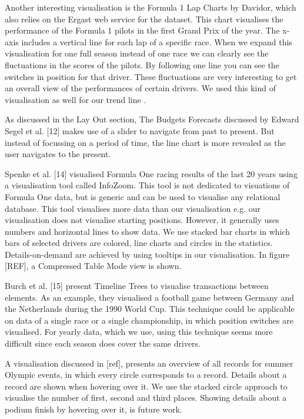 \documentclass{sigchi}
\begin{document}
Another interesting visualisation is the Formula 1 Lap Charts by Davidor, which also relies on the Ergast web service for the dataset. This chart visualises the performance of the Formula 1 pilots in the first Grand Prix of the year. The x-axis includes a vertical line for each lap of a specific race. When we expand this visualisation for one full season instead of one race we can clearly see the fluctuations in the scores of the pilots. By following one line you can see the switches in position for that driver. These fluctuations are very interesting to get an overall view of the performances of certain drivers. We used this kind of visualisation as well for our trend line .

As discussed in the Lay Out section, The Budgets Forecasts discussed by Edward Segel et al. [12] makes use of a slider to navigate from past to present. But instead of focussing on a period of time, the line chart is more revealed as the user navigates to the present.



Spenke et al. [14] visualised Formula One racing results of the last 20 years using a visualisation tool called InfoZoom. This tool is not dedicated to visuations of Formula One data, but is generic and can be used to visualise any relational database. This tool visualises more data than our visualisation e.g. our visualisation does not visualise starting positions. However, it generally uses numbers and horizontal lines to show data. We use stacked bar charts in which bars of selected drivers are colored, line charts and circles in the statistics. Details-on-demand are achieved by using tooltips in our visualisation. In figure [REF], a Compressed Table Mode view is shown.


Burch et al. [15] present Timeline Trees to visualise transactions between elements. As an example, they visualised a football game between Germany and the Netherlands during the 1990 World Cup. This technique could be applicable on data of a single race or a single championship, in which position switches are visualised. For yearly data, which we use, using this technique seems more difficult since each season does cover the same drivers. 

A visualisation discussed in [ref], presents an overview of all records for summer Olympic events, in which every circle corresponds to a record. Details about a record are shown when hovering over it. We use the stacked circle approach to visualise the number of first, second and third places. Showing details about a podium finish by hovering over it, is future work.  
\end{document}

